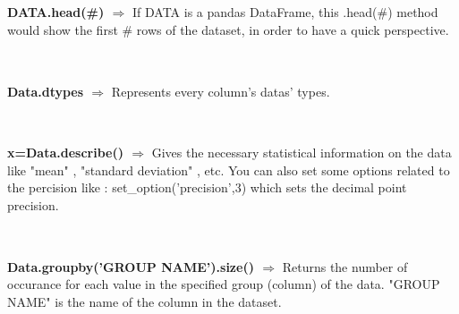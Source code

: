 \documentclass[a4paper,18pt]{article}
\begin{document}

\subsection{\colorbox {matgreen}{\color{white}{\large DATA.head(\#)}}}
\textbf{DATA.head(\#) $\Rightarrow$} If DATA is a pandas DataFrame, this .head(\#) method would show the first \# rows of the dataset, in order to have a quick perspective.\\\\


\subsection{\colorbox {matgreen}{\color{white}{\large Data.dtypes}}}
\textbf{Data.dtypes $\Rightarrow$} Represents every column's datas' types. \\\\



\subsection{\colorbox {matgreen}{\color{white}{\large Data.describe()}}}
\textbf{x=Data.describe() $\Rightarrow$} Gives the necessary statistical information on the data like "mean" , "standard deviation" , etc. You can also set some options related to the percision like : set\_option('precision',3) which sets the decimal point precision. \\\\



\subsection{\colorbox {matgreen}{\color{white}{\large Data.groupby('GROUP NAME').size()}}}
\textbf{Data.groupby('GROUP NAME').size() $\Rightarrow$} Returns the number of occurance for each value in the specified group (column) of the data. "GROUP NAME" is the name of the column in the dataset.\\\\
\end{document}
